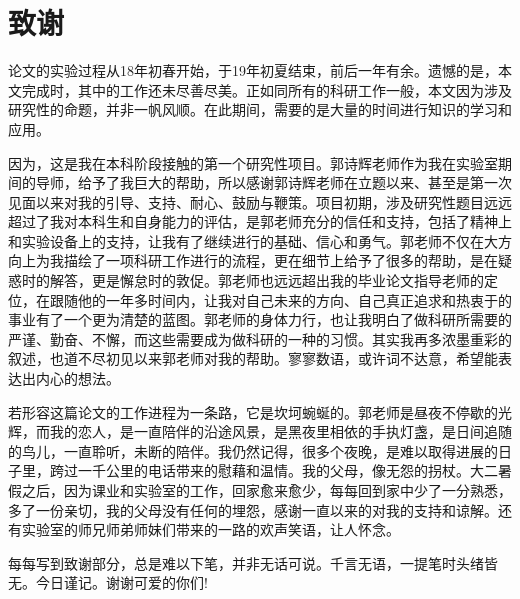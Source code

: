 

\chapter*{致谢}

论文的实验过程从18年初春开始，于19年初夏结束，前后一年有余。遗憾的是，本文完成时，其中的工作还未尽善尽美。正如同所有的科研工作一般，本文因为涉及研究性的命题，并非一帆风顺。在此期间，需要的是大量的时间进行知识的学习和应用。

因为，这是我在本科阶段接触的第一个研究性项目。郭诗辉老师作为我在实验室期间的导师，给予了我巨大的帮助，所以感谢郭诗辉老师在立题以来、甚至是第一次见面以来对我的引导、支持、耐心、鼓励与鞭策。项目初期，涉及研究性题目远远超过了我对本科生和自身能力的评估，是郭老师充分的信任和支持，包括了精神上和实验设备上的支持，让我有了继续进行的基础、信心和勇气。郭老师不仅在大方向上为我描绘了一项科研工作进行的流程，更在细节上给予了很多的帮助，是在疑惑时的解答，更是懈怠时的敦促。郭老师也远远超出我的毕业论文指导老师的定位，在跟随他的一年多时间内，让我对自己未来的方向、自己真正追求和热衷于的事业有了一个更为清楚的蓝图。郭老师的身体力行，也让我明白了做科研所需要的严谨、勤奋、不懈，而这些需要成为做科研的一种的习惯。其实我再多浓墨重彩的叙述，也道不尽初见以来郭老师对我的帮助。寥寥数语，或许词不达意，希望能表达出内心的想法。

若形容这篇论文的工作进程为一条路，它是坎坷蜿蜒的。郭老师是昼夜不停歇的光辉，而我的恋人，是一直陪伴的沿途风景，是黑夜里相依的手执灯盏，是日间追随的鸟儿，一直聆听，未断的陪伴。我仍然记得，很多个夜晚，是难以取得进展的日子里，跨过一千公里的电话带来的慰藉和温情。我的父母，像无怨的拐杖。大二暑假之后，因为课业和实验室的工作，回家愈来愈少，每每回到家中少了一分熟悉，多了一份亲切，我的父母没有任何的埋怨，感谢一直以来的对我的支持和谅解。还有实验室的师兄师弟师妹们带来的一路的欢声笑语，让人怀念。

每每写到致谢部分，总是难以下笔，并非无话可说。千言无语，一提笔时头绪皆无。今日谨记。谢谢可爱的你们!
%
%
%
